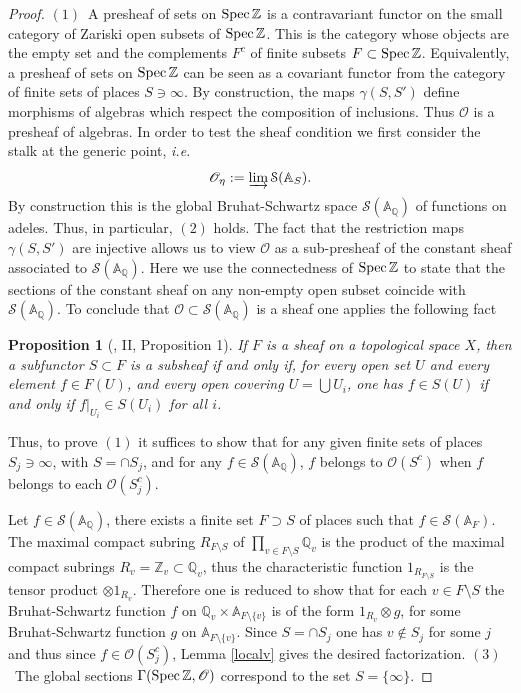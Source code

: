 \documentclass[letterpaper,11pt]{article}
\def\ie{{\it i.e.\/}\ }
\def\Spec{{\rm Spec\,}}
\def\A{{\mathbb A}}
\def\Q{{\mathbb Q}}
\def\Z{\mathbb{Z}}
\def\cS{\mathcal{S}}
\def\sheaf{{\mathscr{O} }}
\theoremstyle{plain}
\newtheorem*{prop*}{Proposition}
\begin{document}
\begin{proof} $(1)$~A presheaf of sets on $\Spec\Z$ is a contravariant functor on the small category of  Zariski open subsets of $\Spec\Z$.  This is the category whose objects are  the empty set and  the complements $F^c$ of finite subsets $F\subset \Spec\Z$. Equivalently,  a presheaf of sets on $\Spec\Z$ can be seen as  a covariant functor from the category of finite sets of places $S\ni \infty$. By construction, the maps $\gamma(S,S')$ define morphisms of algebras  which respect the composition of inclusions. Thus $\sheaf$ is a presheaf of algebras. In order to test the sheaf condition  we first consider  the stalk at the generic point, \ie 
$$
\sheaf_\eta:= \varinjlim \cS(\A_S).
$$ 
 By construction this is the  global Bruhat-Schwartz space $\cS(\A_\Q)$ of functions on adeles. Thus, in particular, $(2)$ holds. The fact that the restriction maps $\gamma(S,S')$ are injective allows us to view  $\sheaf$ as a sub-presheaf of the constant sheaf associated to $\cS(\A_\Q)$.  Here we use  the connectedness of $\Spec\Z$ to state that the sections of the constant sheaf on any non-empty open subset coincide with $\cS(\A_\Q)$. To conclude that $\sheaf\subset \cS(\A_\Q)$ is a sheaf one applies the following fact 
\begin{prop*}[\cite{MM}, II, Proposition 1]
If $F$ is a sheaf on a topological space $X$, then a subfunctor $S \subset F$ is a subsheaf if and only if, for every open set $U$ and every element $f \in F(U)$, and every open covering $U=\bigcup U_i$, one has $f \in S(U)$ if and only if $\left.f\right|_{U_i} \in S(U_i)$ for all $i$.
\end{prop*}

Thus, to prove $(1)$ it suffices to show  that for any given  finite sets of places $S_j\ni \infty$, with $S=\cap S_j$,  and for any  $f\in \cS(\A_\Q)$, $f$ belongs to $\sheaf(S^c)$ when $f$ belongs to each $\sheaf(S_j^c)$.

Let $f\in \cS(\A_\Q)$, there exists a finite set $F\supset S$ of places such that $f\in \cS(\A_F)$. 
The maximal compact subring $R_{F\setminus S}$ of $\prod_{v\in F\setminus S} \Q_v$ is the product of the maximal compact subrings $R_v=\Z_v\subset \Q_v$, thus the characteristic function $1_{R_{F\setminus S}}$ is the tensor product 
$\otimes 1_{R_v}$. Therefore one is reduced  to show that for each $v \in F\setminus S$ the Bruhat-Schwartz function $f$ on  $\Q_v\times \A_{F\setminus\{v\}}$ is of the form $1_{R_v}\otimes g$, for some Bruhat-Schwartz function $g$ on $\A_{F\setminus\{v\}}$. Since $S=\cap S_j$ one has $v\notin S_j$ for some $j$ and thus since $f\in\sheaf(S_j^c)$, Lemma \ref{localv} gives the desired factorization. \newline
$(3)$~The global sections ${\Gamma(\Spec\Z,\sheaf)}$ correspond to the set $S=\{\infty\}$. 
\end{proof} 
\end{document}
